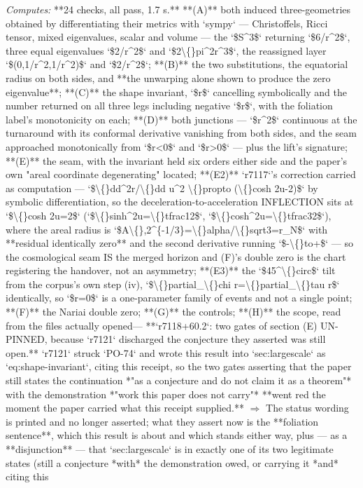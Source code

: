 \begin{description}
\emph{Computes:} **24 checks, all pass, 1.7 s.** **(A)** both induced three-geometries obtained by differentiating their metrics with `sympy` --- Christoffels, Ricci tensor, mixed eigenvalues, scalar and volume --- the `\$S\textasciicircum{}3\$` returning `\$6/r\textasciicircum{}2\$`, three equal eigenvalues `\$2/r\textasciicircum{}2\$` and `\$2\textbackslash\{\}pi\textasciicircum{}2r\textasciicircum{}3\$`, the reassigned layer `\$(0,1/r\textasciicircum{}2,1/r\textasciicircum{}2)\$` and `\$2/r\textasciicircum{}2\$`; **(B)** the two substitutions, the equatorial radius on both sides, and **the unwarping alone shown to produce the zero eigenvalue**; **(C)** the shape invariant, `\$r\$` cancelling symbolically and the number returned on all three legs including negative `\$r\$`, with the foliation label's monotonicity on each; **(D)** both junctions --- `\$r\textasciicircum{}2\$` continuous at the turnaround with its conformal derivative vanishing from both sides, and the seam approached monotonically from `\$r<0\$` and `\$r>0\$` --- plus the lift's signature; **(E)** the seam, with the invariant held six orders either side and the paper's own "areal coordinate degenerating" located; **(E2)**  `r7117`'s correction carried as computation --- `\$\textbackslash\{\}dd\textasciicircum{}2r/\textbackslash\{\}dd u\textasciicircum{}2 \textbackslash\{\}propto (\textbackslash\{\}cosh 2u-2)\$` by symbolic differentiation, so the deceleration-to-acceleration INFLECTION sits at `\$\textbackslash\{\}cosh 2u=2\$` (`\$\textbackslash\{\}sinh\textasciicircum{}2u=\textbackslash\{\}tfrac12\$`, `\$\textbackslash\{\}cosh\textasciicircum{}2u=\textbackslash\{\}tfrac32\$`), where the areal radius is `\$A\textbackslash\{\},2\textasciicircum{}\{-1/3\}=\textbackslash\{\}alpha/\textbackslash\{\}sqrt3=r\_N\$` with **residual identically zero** and the second derivative running `\$-\textbackslash\{\}to+\$` --- so the cosmological seam IS the merged horizon and (F)'s double zero is the chart registering the handover, not an asymmetry; **(E3)** the `\$45\textasciicircum{}\textbackslash\{\}circ\$` tilt from the corpus's own step (iv), `\$\textbackslash\{\}partial\_\textbackslash\{\}chi r=\textbackslash\{\}partial\_\textbackslash\{\}tau r\$` identically, so `\$r=0\$` is a one-parameter family of events and not a single point; **(F)** the Nariai double zero; **(G)** the controls; **(H)** the scope, read from the files actually opened---  **`r7118+60.2`: two gates of section (E) UN-PINNED, because `r7121` discharged the conjecture they asserted was still open.** `r7121` struck `PO-74` and wrote this result into `sec:largescale` as `eq:shape-invariant`, citing this receipt, so the two gates asserting that the paper still states the continuation *"as a conjecture and do not claim it as a theorem"* with the demonstration *"work this paper does not carry"* **went red the moment the paper carried what this receipt supplied.** \ensuremath{\Rightarrow} The status wording is printed and no longer asserted; what they assert now is the **foliation sentence**, which this result is about and which stands either way, plus --- as a **disjunction** --- that `sec:largescale` is in exactly one of its two legitimate states (still a conjecture *with* the demonstration owed, or carrying it *and* citing this 
\end{description}
